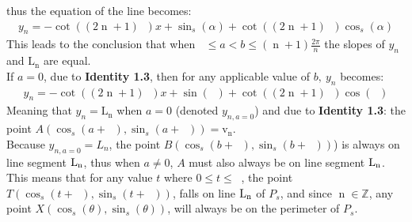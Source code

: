 \documentclass[11pt]{article}
\DeclareMathOperator{\custi}{\mathrm{n}}
\DeclareMathOperator{\period}{\frac{2\pi}{s}}
\DeclareMathOperator{\hp}{\frac{\pi}{s}}
\DeclareMathOperator{\iperiod}{\custi\frac{2\pi}{s}}
\begin{document}
\begin{comment}
(\cos(\iperiod)\tan(\hp))(\sin(a)\cos(b)-\cos(a)\sin(b))+\sin(\iperiod)(\sin(a)\cos(b)-\cos(a)\sin(b))\\
(\cos(\iperiod)\tan(\hp)+\sin(\iperiod)(\sin(a)\cos(b)-\cos(a)\sin(b))\\
(\cos(\iperiod)\tan(\hp)+\sin(\iperiod)\sin(a-b)
\end{gather*}
meaning that we can now simplify the original fraction (denoted \textbf{3.1}) to become:
\begin{gather*}
\frac{(\sin(\iperiod)\tan(\hp)-\cos(\iperiod))\sin(a-b)}{(\cos(\iperiod)\tan(\hp)+\sin(\iperiod))\sin(a-b)}\\
\frac{\sin(\iperiod)\tan(\hp)-\cos(\iperiod)}{\cos(\iperiod)\tan(\hp)+\sin(\iperiod)} * \frac{\cos(\hp)}{\cos(\hp)}\\
\frac{\sin(\iperiod)\sin(\hp)-\cos(\iperiod)\cos(\hp)}{\cos(\iperiod)\sin(\hp)+\sin(\iperiod)\cos(\hp)}\\
\frac{-(\cos(\iperiod)\cos(\hp)-\sin(\iperiod)\sin(\hp))}{\sin(\hp)\cos(\iperiod)+\cos(\hp)\sin(\iperiod)}\\
\frac{-\cos(\iperiod+\hp)}{\sin(\iperiod+\hp)}\\
-\cot(\iperiod+\hp)\\
-\cot((2\custi+1)\hp)
\end{gather*}
\end{comment}
thus the equation of the line becomes:
\begin{gather*}
y_n=-\cot((2\custi+1)\hp)x+\sin_s(\alpha)+\cot((2\custi+1)\hp)\cos_s(\alpha)
\end{gather*}
This leads to the conclusion that when \(\iperiod\leq a<b\leq(\custi+1)\frac{2\pi}{n}\) the slopes of \(y_n\) and \(\mathrm{L_n}\) are equal. \\
If \(a=0\), due to \textbf{Identity 1.3}, then for any applicable value of \(b,\ y_n\) becomes:
\begin{gather*}
y_n=-\cot((2\custi+1)\hp)x+\sin(\iperiod)+\cot((2\custi+1)\hp)\cos(\iperiod)
\end{gather*}
Meaning that \(y_n=\mathrm{L_n}\) when \(a=0\) (denoted \(y_{n,a=0}\)) and due to \textbf{Identity 1.3}: the point \(A(\cos_s(a+\iperiod), \sin_s(a+\iperiod)) = \mathrm{v_n}\).\\
Because \(y_{n,a=0} = L_n\), the point \(B(\cos_s(b+\iperiod),\sin_s(b+\iperiod))\)) is always on line segment \(\rm L_n\), thus when \(a\neq0\), \(A\) must also always be on line segment \(\rm L_n\).\\
This means that for any value \(t\) where \(0\leq t \leq\period\), the point \(T(\cos_s(t+\iperiod),\sin_s(t+\iperiod))\), falls on line \(\rm L_n\) of \(P_s\), and since \(\custi\in\mathbb{Z}\), any point \(X(\cos_s(\theta),\sin_s(\theta))\), will always be on the perimeter of \(P_s\).

\pagebreak

\printbibliography
\end{document}
